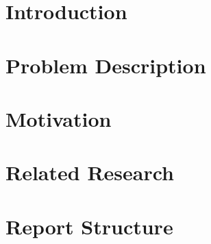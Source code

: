 \section{Introduction}

\section{Problem Description}

\section{Motivation}

\section{Related Research}

\cite{Schneider:2003:CEM:1067807.1067848}
\cite{mccallum1998comparison}
\cite{androutsopoulos2000evaluation}
\cite{bose2008false}
\cite{vanderbauwhede2013high}
\cite{peng2003combining}
\cite{chen2012invited}
\cite{androutsopoulos2000learning}
\cite{he2013massively}
\cite{broder2004network}
\cite{HybridCPUFPGA}
\cite{chalamalasetti2012evaluating}
\cite{sahami1998bayesian}
\cite{bloom1970space}
\cite{metsis2006spam}
\cite{fan2000summary}

\section{Report Structure}
